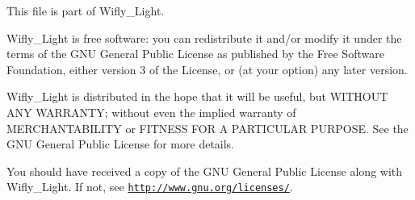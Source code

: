This file is part of Wifly\-\_\-\-Light.

Wifly\-\_\-\-Light is free software\-: you can redistribute it and/or modify it under the terms of the G\-N\-U General Public License as published by the Free Software Foundation, either version 3 of the License, or (at your option) any later version.

Wifly\-\_\-\-Light is distributed in the hope that it will be useful, but W\-I\-T\-H\-O\-U\-T A\-N\-Y W\-A\-R\-R\-A\-N\-T\-Y; without even the implied warranty of M\-E\-R\-C\-H\-A\-N\-T\-A\-B\-I\-L\-I\-T\-Y or F\-I\-T\-N\-E\-S\-S F\-O\-R A P\-A\-R\-T\-I\-C\-U\-L\-A\-R P\-U\-R\-P\-O\-S\-E. See the G\-N\-U General Public License for more details.

You should have received a copy of the G\-N\-U General Public License along with Wifly\-\_\-\-Light. If not, see \href{http://www.gnu.org/licenses/}{\tt http\-://www.\-gnu.\-org/licenses/}. 

